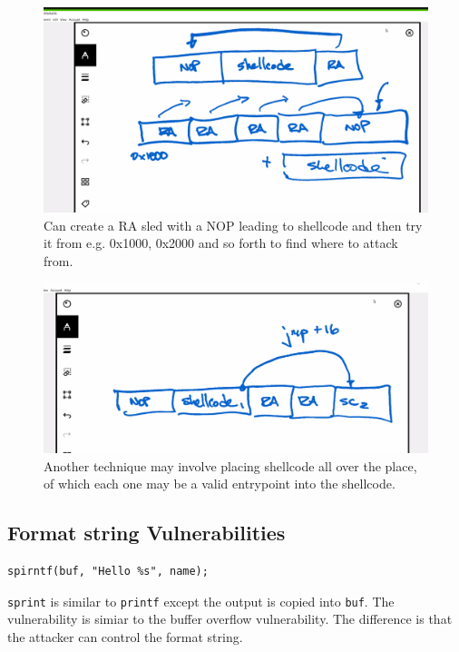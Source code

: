 \documentclass[../notes.tex]{subfiles}
\begin{document}
\begin{figure}[H]
    \centering
    \includegraphics[width=0.8\linewidth]{img/image_2023-01-16-18-37-29.png}
    \caption{Can create a RA sled with a NOP leading to shellcode and then try it from e.g. 0x1000, 0x2000 and so forth to find where to attack from.}



\end{figure}

\begin{figure}[H]
    \centering
    \includegraphics[width=0.8\linewidth]{img/image_2023-01-16-18-40-09.png}
    \caption{Another technique may involve placing shellcode all over the place, of which each one may be a valid entrypoint into the shellcode.}
\end{figure}



\subsection{Format string Vulnerabilities}
\begin{listing}[H]
\begin{verbatim}
spirntf(buf, "Hello %s", name);
\end{verbatim}
\end{listing}


\texttt{sprint} is similar to \texttt{printf} except the output is copied into \texttt{buf}. The vulnerability is simiar to the buffer overflow vulnerability. The difference is that the attacker can control the format string.
\end{document}
